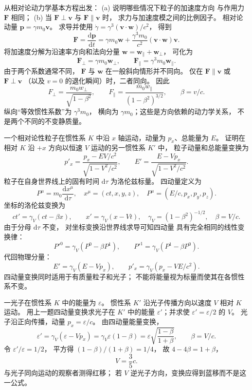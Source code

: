 从相对论动力学基本方程出发：
(a) 说明哪些情况下粒子的加速度方向
与作用力 $\bm F$ 相同；
(b) 当 $\bm F\perp\bm v$ 与
$\bm F\parallel\bm v$ 时，
求力与加速度模之间的比例因子。
\exsolution
相对论动量
$\bm p=\gamma m_0\bm v$。
求导并使用
$\dot\gamma=\gamma^3(\bm v\cdot\bm w)/c^2$，
得到
\[
\bm F
=\frac{\mathrm d\bm p}{\mathrm dt}
=\gamma m_0\bm w+
\frac{\gamma^3m_0}{c^2}
(\bm v\cdot\bm w)\bm v.
\]
将加速度分解为沿速率方向和法向分量
$\bm w=\bm w_\parallel+\bm w_\perp$，
可化为
\[
\bm F_\perp=\gamma m_0\bm w_\perp,\qquad
\bm F_\parallel=\gamma^3m_0\bm w_\parallel.
\]
由于两个系数通常不同，
$\bm F$ 与 $\bm w$ 在一般斜向情形并不同向。
仅在 $\bm F\parallel\bm v$
或 $\bm F\perp\bm v$
（以及 $v=0$ 的退化瞬间）时，二者同向。
因此
\[
\boxed{
F_\perp=\frac{m_0w_\perp}{\sqrt{1-\beta^2}},
\qquad
F_\parallel=\frac{m_0w_\parallel}{(1-\beta^2)^{3/2}}
},\qquad \beta=v/c.
\]
\excheck 纵向“等效惯性系数”为 $\gamma^3m_0$，
横向为 $\gamma m_0$；这些是方向依赖的动力学关系，
不是两个不同的不变静质量。

一个相对论性粒子在惯性系 $K$ 中沿
$x$ 轴运动，动量为 $p_x$、总能量为 $E$。
证明在相对 $K$ 沿 $+x$ 方向以恒速 $V$
运动的另一惯性系 $K'$ 中，
粒子动量和总能量变换为
\[
p'_x=\frac{p_x-EV/c^2}{\sqrt{1-V^2/c^2}},
\qquad
E'=\frac{E-Vp_x}{\sqrt{1-V^2/c^2}}.
\]
\exsolution
粒子在自身世界线上的固有时间
$\mathrm d\tau$ 为洛伦兹标量。
四动量定义为
\[
P^\mu=m_0\frac{\mathrm dx^\mu}{\mathrm d\tau},
\quad
x^\mu=(ct,x,y,z),
\quad
P^\mu=(E/c,p_x,p_y,p_z).
\]
坐标的洛伦兹变换为
\[
ct'=\gamma_V(ct-\beta x),\qquad
x'=\gamma_V(x-Vt),
\quad
\gamma_V=(1-\beta^2)^{-1/2},\quad\beta=V/c.
\]
由于分母 $\mathrm d\tau$ 不变，
对坐标变换沿世界线求导可知四动量
具有完全相同的线性变换律：
\[
P'^0=\gamma_V(P^0-\beta P^1),\qquad
P'^1=\gamma_V(P^1-\beta P^0).
\]
代回物理分量：
\[
\boxed{E'=\gamma_V(E-Vp_x)},\qquad
\boxed{p'_x=\gamma_V(p_x-VE/c^2)}.
\]
\excheck 四动量变换同时适用于有质量粒子和光子；
不能将能量视为标量而使其在各惯性系不变。

一光子在惯性系 $K$ 中的能量为
$\varepsilon$。
惯性系 $K'$ 沿光子传播方向以速度 $V$
相对 $K$ 运动。
用上一题四动量变换求光子在 $K'$ 中的能量
$\varepsilon'$；并求使
$\varepsilon'=\varepsilon/2$ 的 $V$。
\exsolution
光子沿正向传播，动量
$p_x=\varepsilon/c$。
由四动量能量变换，
\[
\varepsilon'=\gamma_V(\varepsilon-Vp_x)
=\gamma_V\varepsilon(1-\beta)
=\boxed{\varepsilon\sqrt{\frac{1-\beta}{1+\beta}}},
\qquad \beta=V/c.
\]
令 $\varepsilon'/\varepsilon=1/2$，
平方得
$(1-\beta)/(1+\beta)=1/4$，
故 $4-4\beta=1+\beta$，
\[
\boxed{V=\frac35c}.
\]
\excheck 与光子同向运动的观察者测得红移；
若 $V$ 逆光子方向，变换应得到蓝移而不是这一公式。

